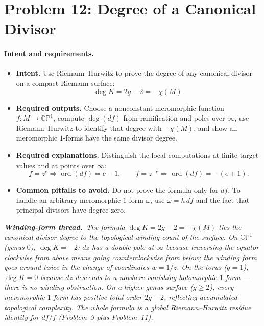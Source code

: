 \documentclass[11pt]{article}
\newcommand{\windingnote}[1]{%
\par\smallskip
\noindent\begin{minipage}{\linewidth}%
\color{windingblue}\small%
\textbf{\textit{Winding-form thread.}}\ \textit{#1}%
\end{minipage}\par\smallskip%
}
\newcommand{\CP}{\mathbb{CP}}
\newcommand{\ord}{\operatorname{ord}}
\newenvironment{intentrequirements}{%
\paragraph{Intent and requirements.}
\begin{itemize}[leftmargin=*, itemsep=0.25em]
}{%
\end{itemize}
}
\begin{document}
\section*{Problem 12: Degree of a Canonical Divisor}

\begin{intentrequirements}
\item \textbf{Intent.} Use Riemann--Hurwitz to prove the degree of any canonical divisor on a compact Riemann surface:
\[
 \deg K=2g-2=-\chi(M).
\]
\item \textbf{Required outputs.} Choose a nonconstant meromorphic function $f:M\to\CP^1$, compute $\deg(df)$ from ramification and poles over $\infty$, use Riemann--Hurwitz to identify that degree with $-\chi(M)$, and show all meromorphic $1$-forms have the same divisor degree.
\item \textbf{Required explanations.} Distinguish the local computations at finite target values and at points over $\infty$:
\[
 f=z^e \Rightarrow \ord(df)=e-1,\qquad
 f=z^{-e}\Rightarrow \ord(df)=-(e+1).
\]
\item \textbf{Common pitfalls to avoid.} Do not prove the formula only for $df$. To handle an arbitrary meromorphic $1$-form $\omega$, use $\omega=h\,df$ and the fact that principal divisors have degree zero.
\end{intentrequirements}

\windingnote{The formula $\deg K=2g-2=-\chi(M)$ ties the canonical-divisor degree to the topological winding count of the surface. On $\CP^1$ (genus $0$), $\deg K=-2$: $dz$ has a double pole at $\infty$ because traversing the equator clockwise from above means going counterclockwise from below; the winding form goes around \emph{twice} in the change of coordinates $w=1/z$. On the torus ($g=1$), $\deg K=0$ because $dz$ descends to a nowhere-vanishing holomorphic $1$-form --- there is no winding obstruction. On a higher genus surface ($g\geq 2$), every meromorphic $1$-form has positive total order $2g-2$, reflecting accumulated topological complexity. The whole formula is a global Riemann--Hurwitz residue identity for $df/f$ (Problem~9 plus Problem~11).}
\end{document}
